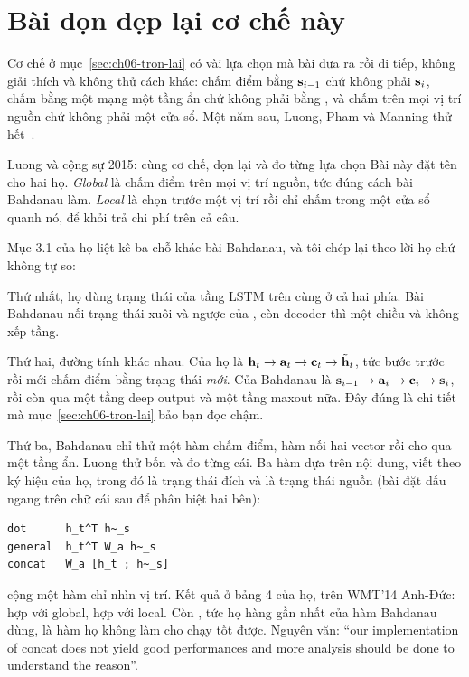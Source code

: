 \section{Bài dọn dẹp lại cơ chế này}
\label{sec:ch06-cau-noi}

%
Cơ chế ở mục~\ref{sec:ch06-tron-lai} có vài lựa chọn mà bài đưa ra rồi đi tiếp,
không giải thích và không thử cách khác: chấm điểm bằng \(\mathbf{s}_{i-1}\) chứ
không phải \(\mathbf{s}_i\), chấm bằng một mạng một tầng ẩn chứ không phải bằng
, và chấm trên mọi vị trí nguồn chứ không phải
một cửa sổ. Một năm
sau, Luong, Pham và Manning thử hết~\autocite{luong2015effective}.

\begin{bridge}{Luong và cộng sự 2015: cùng cơ chế, dọn lại và đo từng lựa chọn}
Bài này đặt tên cho hai họ. \emph{Global} là chấm điểm trên mọi vị trí nguồn,
tức đúng cách bài Bahdanau làm. \emph{Local} là chọn trước một vị trí rồi chỉ
chấm trong một cửa sổ quanh nó, để khỏi trả chi phí trên cả câu.

Mục 3.1 của họ liệt kê ba chỗ khác bài Bahdanau, và tôi chép lại theo lời họ
chứ không tự so:

Thứ nhất, họ dùng trạng thái của tầng LSTM trên cùng ở cả hai phía. Bài
Bahdanau nối trạng thái xuôi và ngược của
, còn decoder thì một chiều và
không xếp tầng.

Thứ hai, đường tính khác nhau. Của họ là
\(\mathbf{h}_t \to \mathbf{a}_t \to \mathbf{c}_t \to \tilde{\mathbf{h}}_t\), tức bước
trước rồi mới chấm điểm bằng trạng thái \emph{mới}. Của Bahdanau là
\(\mathbf{s}_{i-1} \to \mathbf{a}_i \to \mathbf{c}_i \to \mathbf{s}_i\), rồi còn qua
một tầng deep output và một tầng maxout nữa. Đây đúng là chi tiết mà
mục~\ref{sec:ch06-tron-lai} bảo bạn đọc chậm.

Thứ ba, Bahdanau chỉ thử một hàm chấm điểm, hàm nối hai vector rồi cho qua một
tầng ẩn. Luong thử bốn và đo từng cái. Ba hàm dựa trên nội dung, viết theo ký
hiệu của họ, trong đó  là trạng thái đích và 
là trạng thái nguồn (bài đặt dấu ngang trên chữ cái sau để phân biệt hai bên):

\begin{verbatim}
dot      h_t^T h~_s
general  h_t^T W_a h~_s
concat   W_a [h_t ; h~_s]
\end{verbatim}

cộng một hàm chỉ nhìn vị trí. Kết quả ở bảng 4 của họ, trên WMT'14 Anh-Đức:
 hợp với global,  hợp với local. Còn , tức
họ hàng gần nhất của hàm Bahdanau dùng, là hàm họ không làm cho chạy tốt được.
Nguyên văn: \enquote{our implementation of concat does not yield good
performances and more analysis should be done to understand the reason}.


\end{bridge}
